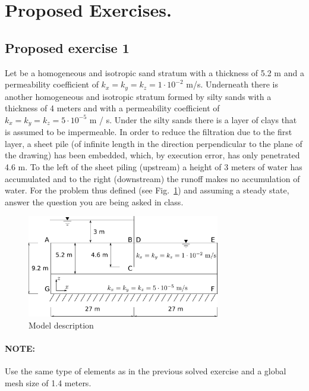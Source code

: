 \section{Proposed Exercises.}

\subsection{Proposed exercise 1}

Let be a homogeneous and isotropic sand stratum with a thickness of
5.2 m and a permeability coefficient of $k_x=k_y=k_z=1\cdot10^{-2}$
m/s.  Underneath there is another homogeneous and isotropic stratum
formed by silty sands with a thickness of 4 meters and with a
permeability coefficient of $k_x=k_y=k_z=5\cdot10^{-5}$ m / s. Under
the silty sands there is a layer of clays that is assumed to be
impermeable. In order to reduce the filtration due to the first layer,
a sheet pile (of infinite length in the direction perpendicular to the
plane of the drawing) has been embedded, which, by execution error, has
only penetrated 4.6 m. To the left of the sheet piling (upstream) a
height of 3 meters of water has accumulated and to the right
(downstream) the runoff makes no accumulation of water. For the
problem thus defined (see Fig.~\ref{enu02}) and assuming a steady
state, answer the question you are being asked in class.
\begin{figure}[!h]
  \begin{center}
    \includegraphics[width=0.75\textwidth]{./body/images/enu02}
  \end{center}
  \caption{Model description}\label{enu02}
\end{figure}



\paragraph{NOTE:} Use the same type of elements as in the previous
solved exercise and a global mesh size of 1.4 meters.

